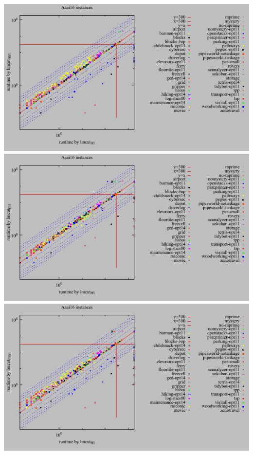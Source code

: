 \includegraphics{tables/aaai16-time-lmcut_ff-lmcut_fflf.pdf}
\linebreak
\includegraphics{tables/aaai16-time-lmcut_ff-lmcut_ffr.pdf}
\linebreak
\includegraphics{tables/aaai16-time-lmcut_ff-lmcut_fflfr.pdf}
\linebreak
